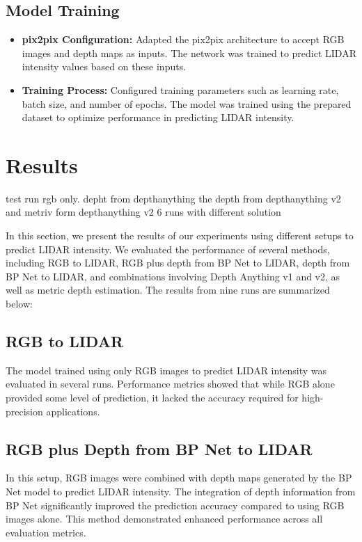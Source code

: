 \subsection{Model Training}
\begin{itemize}
	\item \textbf{pix2pix Configuration:} Adapted the pix2pix architecture to accept RGB images and depth maps as inputs. The network was trained to predict LIDAR intensity values based on these inputs.
	\item \textbf{Training Process:} Configured training parameters such as learning rate, batch size, and number of epochs. The model was trained using the prepared dataset to optimize performance in predicting LIDAR intensity.
\end{itemize}
\section{Results}
test run rgb only. depht from depthanything the depth from depthanything v2 and metriv form depthanything v2 6 runs with different solution

In this section, we present the results of our experiments using different setups to predict LIDAR intensity. We evaluated the performance of several methods, including RGB to LIDAR, RGB plus depth from BP Net to LIDAR, depth from BP Net to LIDAR, and combinations involving Depth Anything v1 and v2, as well as metric depth estimation. The results from nine runs are summarized below:

\subsection{RGB to LIDAR}

The model trained using only RGB images to predict LIDAR intensity was evaluated in several runs. Performance metrics showed that while RGB alone provided some level of prediction, it lacked the accuracy required for high-precision applications.

\subsection{RGB plus Depth from BP Net to LIDAR}

In this setup, RGB images were combined with depth maps generated by the BP Net model to predict LIDAR intensity. The integration of depth information from BP Net significantly improved the prediction accuracy compared to using RGB images alone. This method demonstrated enhanced performance across all evaluation metrics.

